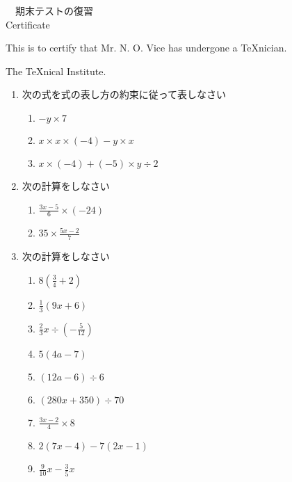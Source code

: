 \documentclass[fleqn]{jsarticle}
\begin{document}
\begin{center}
　期末テストの復習\\[.75cm] Certificate
\end{center}
\noindent This is to certify that Mr. N. O. Vice has undergone a \TeX nician.
\begin{flushright}
  The \TeX nical Institute.
\end{flushright}
\begin{enumerate}
  \item 次の式を式の表し方の約束に従って表しなさい
  \begin{multicols}{2}
  \begin{enumerate}
    \item $\displaystyle -y \times 7$ \\[.75cm]
    \item $\displaystyle x \times x \times \left( -4 \right) -y \times x$
    \item $\displaystyle x \times \left( -4 \right) + \left( -5 \right) \times y \div 2$ \\[.75cm]
  \end{enumerate}
\end{multicols}
\par
\par
\item 次の計算をしなさい
  \begin{multicols}{2}
  \begin{enumerate}
    \item $\displaystyle \frac{3x -5}{6} \times \left( -24 \right)$ \\[.75cm]
    \item $\displaystyle 35 \times \frac{5x-2}{7}$
  \end{enumerate}
  \end{multicols}
\item 次の計算をしなさい
  \begin{multicols}{3}
  \begin{enumerate}
    \item $\displaystyle8\left(\frac{3}{4} + 2\right)$ \\[.75cm]
    \item $\displaystyle \frac{1}{3}\left(9x +6\right)$\\[.75cm]
    \item $\displaystyle \frac{2}{3}x \div \left( - \frac{5}{12} \right)$ 
    \item $\displaystyle 5\left( 4a -7\right)$ \\[.75cm]
    \item $\displaystyle \left(12a -6 \right) \div 6 $ \\[.75cm]
    \item $\displaystyle \left( 280x + 350 \right) \div 70$  
    \item $\displaystyle \frac{3x-2}{4} \times 8$ \\[.75cm]
    \item $\displaystyle 2(7x -4) -7(2x -1)$ \\[.75cm] 
    \item $\displaystyle \frac{9}{10}x -\frac{3}{5}x $
  \end{enumerate}
  \end{multicols}
  \end{enumerate}
\end{document}
